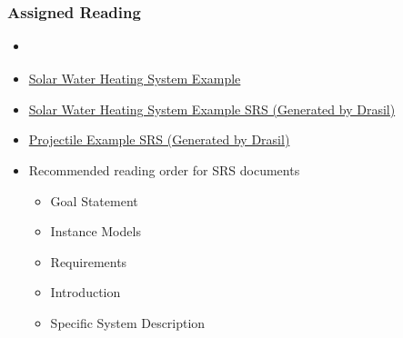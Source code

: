 \documentclass[t,12pt,numbers,fleqn]{beamer}
\begin{document}
\begin{frame}
\frametitle{Assigned Reading}

\begin {itemize}

\item
  \href{https://gitlab.cas.mcmaster.ca/smiths/cas741/blob/master/ReferenceMaterial/ParnasAndClements1986.pdf}
  {}
\item \href{https://github.com/smiths/swhs}{Solar Water Heating System Example}
\item
  \href{https://jacquescarette.github.io/Drasil/examples/SWHS/srs/SWHS_SRS.html}
  {Solar Water Heating System Example SRS (Generated by Drasil)}
\item
  \href{https://jacquescarette.github.io/Drasil/examples/Projectile/srs/Projectile_SRS.html}
  {Projectile Example SRS (Generated by Drasil)}
\item Recommended reading order for SRS documents
\begin{itemize}
\item Goal Statement
\item Instance Models
\item Requirements
\item Introduction
\item Specific System Description
\end{itemize}

\end{itemize}

\end{frame}

\end{document}
